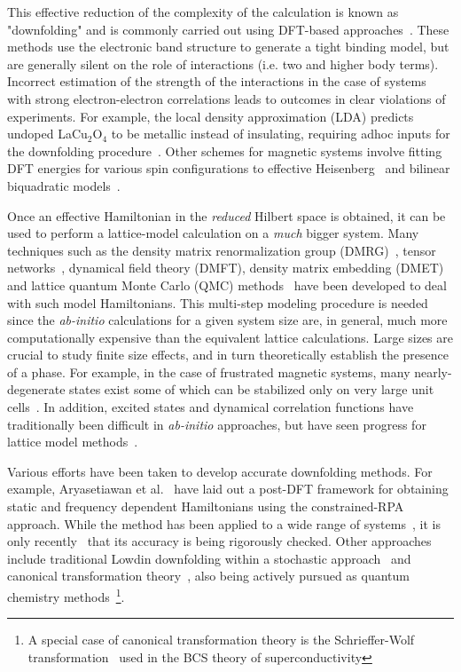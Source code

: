 \documentclass[aip,jcp,twocolumn,10pt]{revtex4-1}
\begin{document}
This effective reduction of the complexity of the calculation is known as "downfolding" 
and is commonly carried out using DFT-based approaches~\cite{Pavirini,Dasgupta}. 
These methods use the electronic band structure to generate a tight binding model, 
but are generally silent on the role of interactions (i.e. two and higher body terms). 
Incorrect estimation of the strength of the interactions 
in the case of systems with strong electron-electron correlations leads to 
outcomes in clear violations of experiments. For example, the local density 
approximation (LDA) predicts undoped LaCu$_2$O$_4$ 
to be metallic instead of insulating, requiring adhoc inputs for 
the downfolding procedure~\cite{Kent_Hubbard}. 
Other schemes for magnetic systems involve fitting DFT energies for 
various spin configurations to effective Heisenberg~\cite{Valenti_kagome} 
and bilinear biquadratic models~\cite{Spaldin}.    

Once an effective Hamiltonian in the \emph{reduced} Hilbert space 
is obtained, it can be used to perform a lattice-model calculation 
on a \emph{much} bigger system. Many techniques such as the density matrix 
renormalization group (DMRG)~\cite{dmrg_white}, tensor networks~\cite{tps_nishino,Vidal_MERA,
TPS_review,Changlani_CPS,Neuscamman_CPS,mezzacapo,Marti}, 
dynamical field theory (DMFT), density matrix embedding (DMET)~\cite{DMET_2012,Chen_DMET} 
and lattice quantum Monte Carlo (QMC) methods~\cite{Sandvik_loops,Blankenbecler,Alavi_FCIQMC,SQMC} 
have been developed to deal with such model Hamiltonians. 
This multi-step modeling procedure is needed since the \emph{ab-initio} 
calculations for a given system size are, in general, much more 
computationally expensive than the equivalent lattice calculations. 
Large sizes are crucial to study finite size effects, and in turn 
theoretically establish the presence of a phase. For example, in the case of 
frustrated magnetic systems, many nearly-degenerate states exist some of which can be 
stabilized only on very large unit cells~\cite{Marston_Zeng}. 
In addition, excited states and dynamical correlation functions have traditionally 
been difficult in \emph{ab-initio} approaches, 
but have seen progress for lattice model methods~\cite{Daley_tDMRG, White_tDMRG}.

Various efforts have been taken to develop accurate downfolding 
methods. For example, Aryasetiawan et al.~\cite{Aryasetiawan} 
have laid out a post-DFT framework for obtaining 
static and frequency dependent Hamiltonians using the 
constrained-RPA approach. While the method has been applied to 
a wide range of systems~\cite{Imada1,Imada2,Arya1,Arya2,Wehling_graphene}, 
it is only recently~\cite{RPA_Troyer} that its accuracy is being rigorously checked. 
Other approaches include traditional Lowdin downfolding 
within a stochastic approach~\cite{Tenno} and 
canonical transformation theory~\cite{White_CT,Yanai_CT}, 
also being actively pursued as quantum chemistry 
methods~\footnote{A special case of canonical transformation theory is 
the Schrieffer-Wolf transformation~\cite{Schrieffer_Wolff} used in the 
BCS theory of superconductivity}.  
\end{document}

